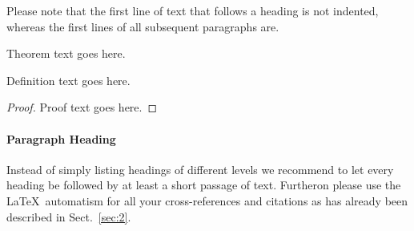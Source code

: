 Please note that the first line of text that follows a heading is not indented, whereas the first lines of all subsequent paragraphs are.

\begin{theorem}
    Theorem text goes here.
\end{theorem}
%
%
\begin{definition}
    Definition text goes here.
\end{definition}

\begin{proof}
    Proof text goes here.
\end{proof}

\paragraph{Paragraph Heading} %
Instead of simply listing headings of different levels we recommend to let every heading be followed by at least a short passage of text. Furtheron please use the \LaTeX\ automatism for all your cross-references and citations as has already been described in Sect.~\ref{sec:2}.

